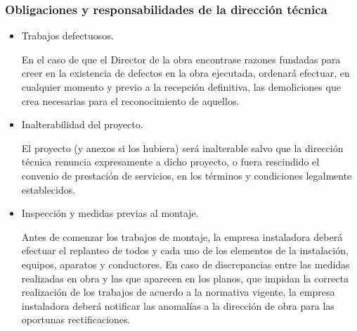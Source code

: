 \documentclass[../main.tex]{subfiles}
\begin{document}
\subsubsection{Obligaciones y responsabilidades de la dirección técnica}
\begin{itemize}
    \item Trabajos defectuosos. \par
    \vspace{0.5 cm}
    En el caso de que el Director de la obra encontrase razones fundadas para creer en la existencia de defectos en la obra ejecutada, ordenará efectuar, en cualquier momento y previo a la recepción definitiva, las demoliciones que crea necesarias para el reconocimiento de aquellos.
    \item Inalterabilidad del proyecto. \par
    \vspace{0.5 cm}
    El proyecto (y anexos si los hubiera) será inalterable salvo que la dirección técnica renuncia expresamente a dicho proyecto, o fuera rescindido el convenio de prestación de servicios, en los términos y condiciones legalmente establecidos.
    \item Inspección y medidas previas al montaje. \par
    \vspace{0.5 cm}
    Antes de comenzar los trabajos de montaje, la empresa instaladora deberá efectuar el replanteo de todos y cada uno de los elementos de la instalación, equipos, aparatos y conductores. En caso de discrepancias entre las medidas realizadas en obra y las que aparecen en los planos, que impidan la correcta realización de los trabajos de acuerdo a la normativa vigente, la empresa instaladora deberá notificar las anomalías a la dirección de obra para las oportunas rectificaciones.
\end{itemize}
\end{document}
